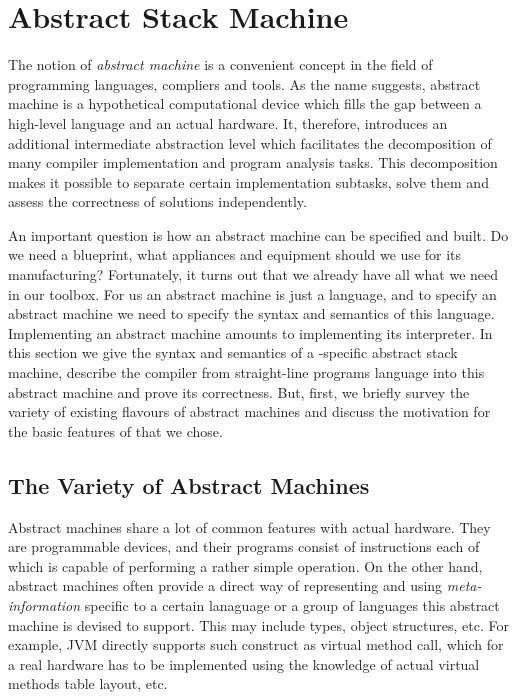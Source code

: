 \chapter{Abstract Stack Machine}

The notion of \emph{abstract machine} is a convenient concept in the field of programming languages, compliers and tools.
As the name suggests, abstract machine is a hypothetical computational device which fills the gap between a high-level language
and an actual hardware. It, therefore, introduces an additional intermediate abstraction level which facilitates the
decomposition of many compiler implementation and program analysis tasks. This decomposition makes it possible to separate
certain implementation subtasks, solve them and assess the correctness of solutions independently.

An important question is how an abstract machine can be specified and built. Do we need a blueprint, what appliances and equipment
should we use for its manufacturing? Fortunately, it turns out that we already have all what we need in our toolbox. For us an
abstract machine is just a language, and to specify an abstract machine we need to specify the syntax and semantics of
this language. Implementing an abstract machine amounts to implementing its interpreter. In this section we
give the syntax and semantics of a \lama-specific abstract stack machine, describe the compiler from straight-line
programs language into this abstract machine and prove its correctness. But, first, we briefly survey the variety of existing
flavours of abstract machines and discuss the motivation for the basic features of that we chose.

\section{The Variety of Abstract Machines}

Abstract machines share a lot of common features with actual hardware. They are programmable devices, and their
programs consist of instructions each of which is capable of performing a rather simple operation. On the other hand,
abstract machines often provide a direct way of representing and using \emph{meta-information} specific to a certain
lanaguage or a group of languages this abstract machine is devised to support. This may include types, object structures, etc.
For example, JVM directly supports such construct as virtual method call, which for a real hardware has to be
implemented using the knowledge of actual virtual methods table layout, etc. 



